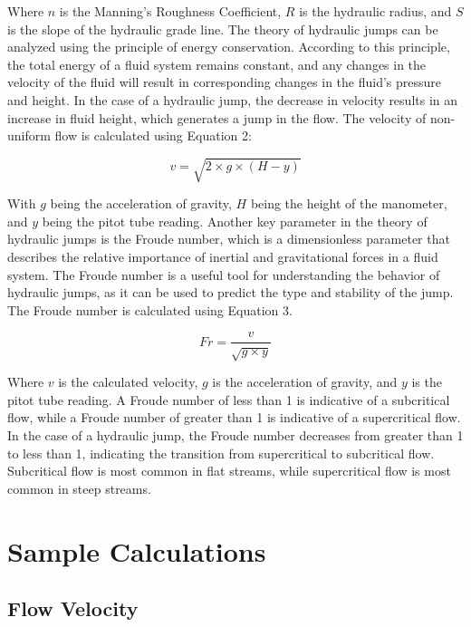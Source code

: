 \documentclass{article}
\begin{document}
\noindent Where $n$ is the Manning's Roughness Coefficient, $R$ is the hydraulic radius, and $S$ is the slope of the hydraulic grade line. The theory of hydraulic jumps can be analyzed using the principle of energy conservation. According to this principle, the total energy of a fluid system remains constant, and any changes in the velocity of the fluid will result in corresponding changes in the fluid's pressure and height. In the case of a hydraulic jump, the decrease in velocity results in an increase in fluid height, which generates a jump in the flow. The velocity of non-uniform flow is calculated using Equation 2: 

\begin{equation}
    v=\sqrt{2\times g\times (H-y)}
\end{equation}

\noindent With $g$ being the acceleration of gravity, $H$ being the height of the manometer, and $y$ being the pitot tube reading. Another key parameter in the theory of hydraulic jumps is the Froude number, which is a dimensionless parameter that describes the relative importance of inertial and gravitational forces in a fluid system. The Froude number is a useful tool for understanding the behavior of hydraulic jumps, as it can be used to predict the type and stability of the jump. The Froude number is calculated using Equation 3. 

\begin{equation}
    Fr=\frac{v}{\sqrt{g\times y}}
\end{equation}

\noindent Where $v$ is the calculated velocity, $g$ is the acceleration of gravity, and $y$ is the pitot tube reading. A Froude number of less than 1 is indicative of a subcritical flow, while a Froude number of greater than 1 is indicative of a supercritical flow. In the case of a hydraulic jump, the Froude number decreases from greater than 1 to less than 1, indicating the transition from supercritical to subcritical flow. Subcritical flow is most common in flat streams, while supercritical flow is most common in steep streams.
\newpage
\section{Sample Calculations}
\singlespacing
\subsection{Flow Velocity}
\end{document}
